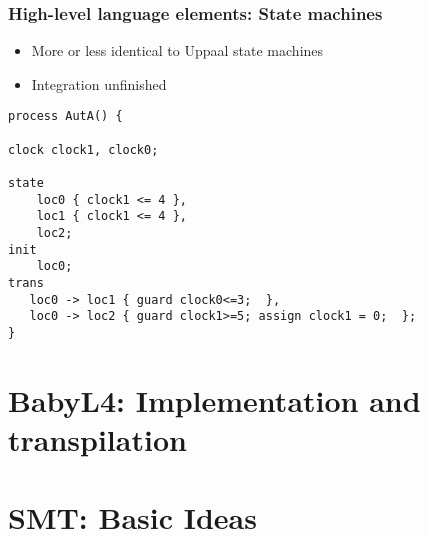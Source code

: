 \documentclass{beamer}
\begin{document}
\begin{frame}[fragile]\frametitle{High-level language elements: State machines}

  \begin{itemize}
  \item More or less identical to Uppaal state machines
  \item Integration unfinished
  \end{itemize}

  \begin{verbatim}
process AutA() {

clock clock1, clock0;

state
    loc0 { clock1 <= 4 },
    loc1 { clock1 <= 4 },
    loc2;
init
    loc0;
trans
   loc0 -> loc1 { guard clock0<=3;  },
   loc0 -> loc2 { guard clock1>=5; assign clock1 = 0;  };
}
\end{verbatim}
  

\end{frame}



\section{BabyL4: Implementation and transpilation}




\section{SMT: Basic Ideas}
\end{document}
